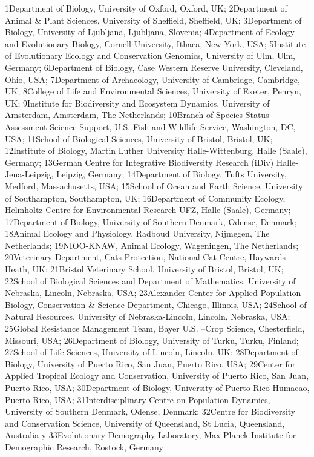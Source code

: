 \documentclass[
  12pt,
  letterpaper,
]{book}
\begin{document}
1Department of Biology, University of Oxford, Oxford, UK; 2Department of
Animal \& Plant Sciences, University of Sheffield, Sheffield, UK;
3Department of Biology, University of Ljubljana, Ljubljana, Slovenia;
4Department of Ecology and Evolutionary Biology, Cornell University,
Ithaca, New York, USA; 5Institute of Evolutionary Ecology and
Conservation Genomics, University of Ulm, Ulm, Germany; 6Department of
Biology, Case Western Reserve University, Cleveland, Ohio, USA;
7Department of Archaeology, University of Cambridge, Cambridge, UK;
8College of Life and Environmental Sciences, University of Exeter,
Penryn, UK; 9Institute for Biodiversity and Ecosystem Dynamics,
University of Amsterdam, Amsterdam, The Netherlands; 10Branch of Species
Status Assessment Science Support, U.S. Fish and Wildlife Service,
Washington, DC, USA; 11School of Biological Sciences, University of
Bristol, Bristol, UK; 12Institute of Biology, Martin Luther University
Halle-Wittenburg, Halle (Saale), Germany; 13German Centre for
Integrative Biodiversity Research (iDiv) Halle-Jena-Leipzig, Leipzig,
Germany; 14Department of Biology, Tufts University, Medford,
Massachusetts, USA; 15School of Ocean and Earth Science, University of
Southampton, Southampton, UK; 16Department of Community Ecology,
Helmholtz Centre for Environmental Research-UFZ, Halle (Saale), Germany;
17Department of Biology, University of Southern Denmark, Odense,
Denmark; 18Animal Ecology and Physiology, Radboud University, Nijmegen,
The Netherlands; 19NIOO-KNAW, Animal Ecology, Wageningen, The
Netherlands; 20Veterinary Department, Cats Protection, National Cat
Centre, Haywards Heath, UK; 21Bristol Veterinary School, University of
Bristol, Bristol, UK; 22School of Biological Sciences and Department of
Mathematics, University of Nebraska, Lincoln, Nebraska, USA; 23Alexander
Center for Applied Population Biology, Conservation \& Science
Department, Chicago, Illinois, USA; 24School of Natural Resources,
University of Nebraska-Lincoln, Lincoln, Nebraska, USA; 25Global
Resistance Management Team, Bayer U.S. --Crop Science, Chesterfield,
Missouri, USA; 26Department of Biology, University of Turku, Turku,
Finland; 27School of Life Sciences, University of Lincoln, Lincoln, UK;
28Department of Biology, University of Puerto Rico, San Juan, Puerto
Rico, USA; 29Center for Applied Tropical Ecology and Conservation,
University of Puerto Rico, San Juan, Puerto Rico, USA; 30Department of
Biology, University of Puerto Rico-Humacao, Puerto Rico, USA;
31Interdisciplinary Centre on Population Dynamics, University of
Southern Denmark, Odense, Denmark; 32Centre for Biodiversity and
Conservation Science, University of Queensland, St Lucia, Queensland,
Australia y 33Evolutionary Demography Laboratory, Max Planck Institute
for Demographic Research, Rostock, Germany
\end{document}
